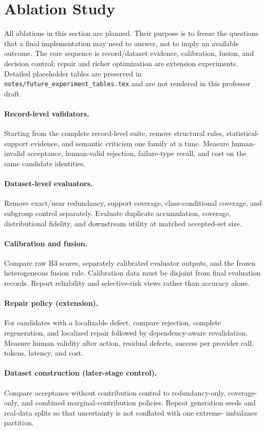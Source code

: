 \section{Ablation Study}
\label{sec:ablations}

All ablations in this section are planned. Their purpose is to freeze the
questions that a final implementation may need to answer, not to imply an
available outcome. The core sequence is record/dataset evidence, calibration,
fusion, and decision control; repair and richer optimization are extension
experiments. Detailed placeholder tables are preserved in
\texttt{notes/future\_experiment\_tables.tex} and are not rendered in this
professor draft.

\paragraph{Record-level validators.}
Starting from the complete record-level suite, remove structural rules,
statistical-support evidence, and semantic criticism one family at a time.
Measure human-invalid acceptance, human-valid rejection, failure-type recall,
and cost on the same candidate identities.

\paragraph{Dataset-level evaluators.}
Remove exact/near redundancy, support coverage, class-conditional coverage,
and subgroup control separately. Evaluate duplicate accumulation, coverage,
distributional fidelity, and downstream utility at matched accepted-set size.

\paragraph{Calibration and fusion.}
Compare raw B3 scores, separately calibrated evaluator outputs, and the frozen
heterogeneous fusion rule. Calibration data must be disjoint from final
evaluation records. Report reliability and selective-risk views rather than
accuracy alone.

\paragraph{Repair policy (extension).}
For candidates with a localizable defect, compare rejection, complete
regeneration, and localized repair followed by dependency-aware revalidation.
Measure human validity after action, residual defects, success per provider
call, tokens, latency, and cost.

\paragraph{Dataset construction (later-stage control).}
Compare acceptance without contribution control to redundancy-only, coverage-
only, and combined marginal-contribution policies. Repeat generation seeds and
real-data splits so that uncertainty is not conflated with one extreme-
imbalance partition.

